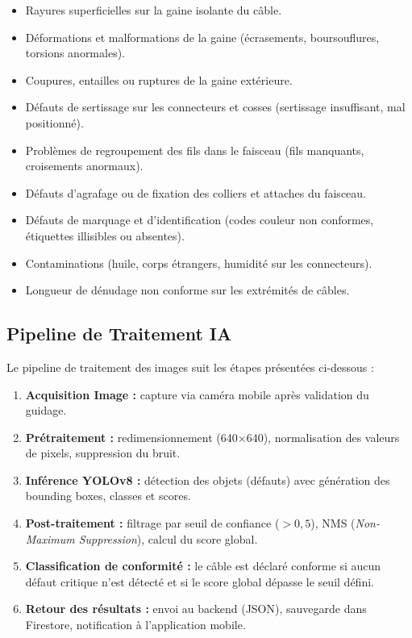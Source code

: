 \begin{itemize}
    \item Rayures superficielles sur la gaine isolante du câble.
    \item Déformations et malformations de la gaine (écrasements, boursouflures, torsions anormales).
    \item Coupures, entailles ou ruptures de la gaine extérieure.
    \item Défauts de sertissage sur les connecteurs et cosses (sertissage insuffisant, mal positionné).
    \item Problèmes de regroupement des fils dans le faisceau (fils manquants, croisements anormaux).
    \item Défauts d'agrafage ou de fixation des colliers et attaches du faisceau.
    \item Défauts de marquage et d'identification (codes couleur non conformes, étiquettes illisibles ou absentes).
    \item Contaminations (huile, corps étrangers, humidité sur les connecteurs).
    \item Longueur de dénudage non conforme sur les extrémités de câbles.
\end{itemize}

\subsection{Pipeline de Traitement IA}

Le pipeline de traitement des images suit les étapes présentées ci-dessous :

\begin{enumerate}
    \item \textbf{Acquisition Image :} capture via caméra mobile après validation du guidage.
    \item \textbf{Prétraitement :} redimensionnement (640$\times$640), normalisation des valeurs de pixels, suppression du bruit.
    \item \textbf{Inférence YOLOv8 :} détection des objets (défauts) avec génération des bounding boxes, classes et scores.
    \item \textbf{Post-traitement :} filtrage par seuil de confiance ($> 0{,}5$), NMS (\textit{Non-Maximum Suppression}), calcul du score global.
    \item \textbf{Classification de conformité :} le câble est déclaré conforme si aucun défaut critique n'est détecté et si le score global dépasse le seuil défini.
    \item \textbf{Retour des résultats :} envoi au backend (JSON), sauvegarde dans Firestore, notification à l'application mobile.
\end{enumerate}

